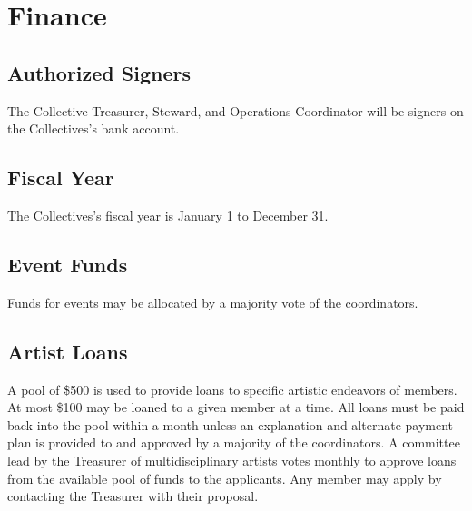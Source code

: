 \chapter{Finance}

\section{Authorized Signers}\label{sec:authorized_signers}
The Collective Treasurer, Steward, and Operations Coordinator will be signers on the Collectives's bank account.

\section{Fiscal Year}\label{sec:fiscal_year}
The Collectives's fiscal year is January 1 to December 31.

\section{Event Funds}\label{sec:event_funds}
Funds for events may be allocated by a majority vote of the coordinators.

\section{Artist Loans}\label{sec:artist_loans}
A pool of \$500 is used to provide loans to specific artistic endeavors of members. At most \$100 may be loaned to a given member at a time. All loans must be paid back into the pool within a month unless an explanation and alternate payment plan is provided to and approved by a majority of the coordinators. A committee lead by the Treasurer of multidisciplinary artists votes monthly to approve loans from the available pool of funds to the applicants. Any member may apply by contacting the Treasurer with their proposal.
